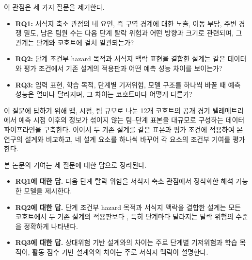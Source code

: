 이 관점은 세 가지 질문을 제기한다.
\begin{itemize}
    \item \textbf{RQ1:}
    서식지 축소 관점의 네 요인, 즉 구역 경계에 대한 노출, 이동 부담, 주변 경쟁 밀도, 남은 팀원 수는 다음 단계 탈락 위험과 어떤 방향과 크기로 관련되며, 그 관계는 단계와 코호트에 걸쳐 일관되는가?

    \item \textbf{RQ2:}
    단계 조건부 hazard 목적과 서식지 맥락 표현을 결합한 설계는 같은 데이터와 평가 조건에서 기존 설계의 적용판과 어떤 예측 성능 차이를 보이는가?

    \item \textbf{RQ3:}
    입력 표현, 학습 목적, 단계별 기저위험, 모델 구조를 하나씩 바꿀 때 예측 성능은 얼마나 달라지며, 그 차이는 코호트마다 어떻게 다른가?
\end{itemize}

이 질문에 답하기 위해 맵, 시점, 팀 규모로 나눈 12개 코호트의 공개 경기 텔레메트리에서 예측 시점 이후의 정보가 섞이지 않는 팀--단계 표본을 대규모로 구성하는 데이터 파이프라인을 구축한다.
이어서 두 기존 설계를 같은 표본과 평가 조건에 적용하여 본 연구의 설계와 비교하고, 네 설계 요소를 하나씩 바꾸어 각 요소의 조건부 기여를 평가한다.

본 논문의 기여는 세 질문에 대한 답으로 정리된다.
\begin{itemize}
    \item \textbf{RQ1에 대한 답.}
    다음 단계 탈락 위험을 서식지 축소 관점에서 정식화한 해석 가능한 모델을 제시한다.

    \item \textbf{RQ2에 대한 답.}
    단계 조건부 hazard 목적과 서식지 맥락을 결합한 설계는 모든 코호트에서 두 기존 설계의 적용판보다 , 특히 단계마다 달라지는 탈락 위험의 수준을 정확하게 나타낸다.

    \item \textbf{RQ3에 대한 답.}
    상대위험 기반 설계와의 차이는 주로 단계별 기저위험과 학습 목적이, 활동 점수 기반 설계와의 차이는 주로 서식지 맥락이 설명한다.
\end{itemize}
